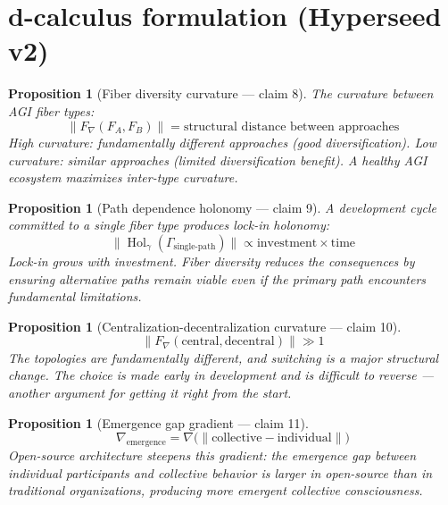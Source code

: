\documentclass[11pt,a4paper]{article}
\newtheorem{proposition}[definition]{Proposition}
\begin{document}
\section{d-calculus formulation (Hyperseed v2)}

\begin{proposition}[Fiber diversity curvature --- claim 8]
\label{prop:diversity}
The curvature between AGI fiber types:
\[
  \|F_\nabla(F_A, F_B)\| = \text{structural distance between approaches}
\]
High curvature: fundamentally different approaches (good diversification).
Low curvature: similar approaches (limited diversification benefit).
A healthy AGI ecosystem maximizes inter-type curvature.
\end{proposition}

\begin{proposition}[Path dependence holonomy --- claim 9]
\label{prop:lock}
A development cycle committed to a single fiber type produces lock-in
holonomy:
\[
  \|\operatorname{Hol}_\gamma(\Gamma_{\text{single-path}})\| \propto
    \text{investment} \times \text{time}
\]
Lock-in grows with investment. Fiber diversity reduces the consequences
by ensuring alternative paths remain viable even if the primary path
encounters fundamental limitations.
\end{proposition}

\begin{proposition}[Centralization-decentralization curvature --- claim 10]
\label{prop:central}
\[
  \|F_\nabla(\text{central}, \text{decentral})\| \gg 1
\]
The topologies are fundamentally different, and switching is a major
structural change. The choice is made early in development and is
difficult to reverse --- another argument for getting it right from
the start.
\end{proposition}

\begin{proposition}[Emergence gap gradient --- claim 11]
\label{prop:emergence_grad}
\[
  \nabla_{\text{emergence}} = \nabla\bigl(\|\text{collective} -
    \text{individual}\|\bigr)
\]
Open-source architecture steepens this gradient: the emergence gap
between individual participants and collective behavior is larger
in open-source than in traditional organizations, producing more
emergent collective consciousness.
\end{proposition}
\end{document}
